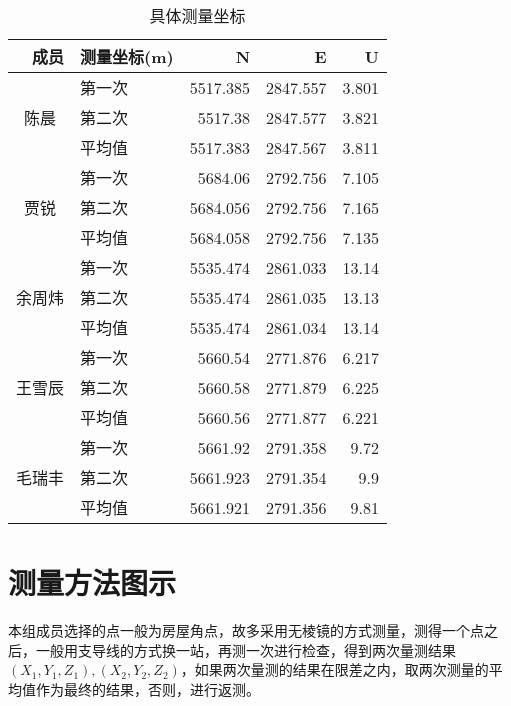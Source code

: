 \begin{table}[htbp]
  \centering
  \caption{具体测量坐标}
    \begin{tabular}{|c|p{6em}|r|r|r|}
\hline    \multicolumn{1}{|r|}{成员} & 测量坐标(\si{m}) & \multicolumn{1}{p{5em}|}{N} & \multicolumn{1}{p{5em}|}{E} & \multicolumn{1}{p{5em}|}{U}\\ \hline
    \multicolumn{1}{|c|}{\multirow{3}[5]{*}{陈晨}} & 第一次 & 5517.385 & 2847.557 & 3.801 \\
\cline{2-5}       & 第二次 & 5517.38 & 2847.577 & 3.821 \\
\cline{2-5}       & 平均值 & 5517.383 & 2847.567 & 3.811 \\
    \hline
    \multicolumn{1}{|c|}{\multirow{3}[6]{*}{贾锐}} & 第一次 & 5684.06 & 2792.756 & 7.105 \\
\cline{2-5}       & 第二次 & 5684.056 & 2792.756 & 7.165 \\
\cline{2-5}       & 平均值 & 5684.058 & 2792.756 & 7.135 \\
    \hline
    \multicolumn{1}{|c|}{\multirow{3}[6]{*}{余周炜}} & 第一次 & 5535.474 & 2861.033 & 13.14 \\
\cline{2-5}       & 第二次 & 5535.474 & 2861.035 & 13.13 \\
\cline{2-5}       & 平均值 & 5535.474 & 2861.034 & 13.14 \\
    \hline
    \multicolumn{1}{|c|}{\multirow{3}[6]{*}{王雪辰}} & 第一次 & 5660.54 & 2771.876 & 6.217 \\
\cline{2-5}       & 第二次 & 5660.58 & 2771.879 & 6.225 \\
\cline{2-5}       & 平均值 & 5660.56 & 2771.877 & 6.221 \\
    \hline
    \multicolumn{1}{|c|}{\multirow{3}[6]{*}{毛瑞丰}} & 第一次 & 5661.92 & 2791.358 & 9.72 \\
\cline{2-5}       & 第二次 & 5661.923 & 2791.354 & 9.9 \\
\cline{2-5}       & 平均值 & 5661.921 & 2791.356 & 9.81 \\
    \hline
    \end{tabular}%
  \label{tab:2}%
\end{table}%

\section{测量方法图示}

本组成员选择的点一般为房屋角点，故多采用无棱镜的方式测量，测得一个点之后，一般用支导线的方式换一站，再测一次进行检查，得到两次量测结果$(X_1,Y_1,Z_1),(X_2,Y_2,Z_2)$，如果两次量测的结果在限差之内，取两次测量的平均值作为最终的结果，否则，进行返测。

